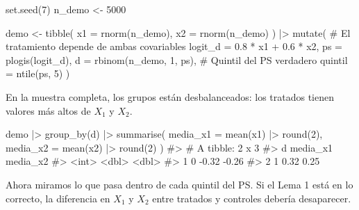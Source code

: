 \documentclass[
  letterpaper,
  DIV=11,
  numbers=noendperiod,
  oneside]{scrreprt}
\newenvironment{Shaded}{\begin{snugshade}}{\end{snugshade}}
\newcommand{\AttributeTok}[1]{\textcolor[rgb]{0.40,0.45,0.13}{#1}}
\newcommand{\CommentTok}[1]{\textcolor[rgb]{0.37,0.37,0.37}{#1}}
\newcommand{\DecValTok}[1]{\textcolor[rgb]{0.68,0.00,0.00}{#1}}
\newcommand{\FloatTok}[1]{\textcolor[rgb]{0.68,0.00,0.00}{#1}}
\newcommand{\FunctionTok}[1]{\textcolor[rgb]{0.28,0.35,0.67}{#1}}
\newcommand{\NormalTok}[1]{\textcolor[rgb]{0.00,0.23,0.31}{#1}}
\newcommand{\OtherTok}[1]{\textcolor[rgb]{0.00,0.23,0.31}{#1}}
\newcommand{\SpecialCharTok}[1]{\textcolor[rgb]{0.37,0.37,0.37}{#1}}
\begin{document}
\begin{Shaded}
\begin{Highlighting}[]
\FunctionTok{set.seed}\NormalTok{(}\DecValTok{7}\NormalTok{)}
\NormalTok{n\_demo }\OtherTok{\textless{}{-}} \DecValTok{5000}

\NormalTok{demo }\OtherTok{\textless{}{-}} \FunctionTok{tibble}\NormalTok{(}
  \AttributeTok{x1 =} \FunctionTok{rnorm}\NormalTok{(n\_demo),}
  \AttributeTok{x2 =} \FunctionTok{rnorm}\NormalTok{(n\_demo)}
\NormalTok{) }\SpecialCharTok{|\textgreater{}}
  \FunctionTok{mutate}\NormalTok{(}
    \CommentTok{\# El tratamiento depende de ambas covariables}
    \AttributeTok{logit\_d =} \FloatTok{0.8} \SpecialCharTok{*}\NormalTok{ x1 }\SpecialCharTok{+} \FloatTok{0.6} \SpecialCharTok{*}\NormalTok{ x2,}
    \AttributeTok{ps      =} \FunctionTok{plogis}\NormalTok{(logit\_d),}
    \AttributeTok{d       =} \FunctionTok{rbinom}\NormalTok{(n\_demo, }\DecValTok{1}\NormalTok{, ps),}
    \CommentTok{\# Quintil del PS verdadero}
    \AttributeTok{quintil =} \FunctionTok{ntile}\NormalTok{(ps, }\DecValTok{5}\NormalTok{)}
\NormalTok{  )}
\end{Highlighting}
\end{Shaded}

En la muestra completa, los grupos están desbalanceados: los tratados
tienen valores más altos de \(X_1\) y \(X_2\).

\begin{Shaded}
\begin{Highlighting}[]
\NormalTok{demo }\SpecialCharTok{|\textgreater{}}
  \FunctionTok{group\_by}\NormalTok{(d) }\SpecialCharTok{|\textgreater{}}
  \FunctionTok{summarise}\NormalTok{(}
    \AttributeTok{media\_x1 =} \FunctionTok{mean}\NormalTok{(x1) }\SpecialCharTok{|\textgreater{}} \FunctionTok{round}\NormalTok{(}\DecValTok{2}\NormalTok{),}
    \AttributeTok{media\_x2 =} \FunctionTok{mean}\NormalTok{(x2) }\SpecialCharTok{|\textgreater{}} \FunctionTok{round}\NormalTok{(}\DecValTok{2}\NormalTok{)}
\NormalTok{  )}
\CommentTok{\#\textgreater{} \# A tibble: 2 x 3}
\CommentTok{\#\textgreater{}       d media\_x1 media\_x2}
\CommentTok{\#\textgreater{}   \textless{}int\textgreater{}    \textless{}dbl\textgreater{}    \textless{}dbl\textgreater{}}
\CommentTok{\#\textgreater{} 1     0    {-}0.32    {-}0.26}
\CommentTok{\#\textgreater{} 2     1     0.32     0.25}
\end{Highlighting}
\end{Shaded}

Ahora miramos lo que pasa dentro de cada quintil del PS. Si el Lema 1
está en lo correcto, la diferencia en \(X_1\) y \(X_2\) entre tratados y
controles debería desaparecer.
\end{document}
